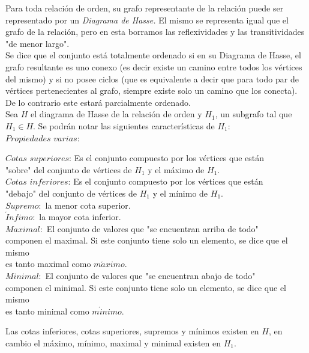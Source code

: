 \documentclass[titlepage,a4paper,12pt,twoside]{article}
\begin{document}
Para toda relación de orden, su grafo representante de la relación puede ser representado por un \textit{Diagrama de Hasse.} El mismo se representa igual que el grafo de la relación, pero en esta borramos las reflexividades y las transitividades "de menor largo".\\

Se dice que el conjunto está totalmente ordenado si en su Diagrama de Hasse, el grafo resultante es uno conexo (es decir existe un camino entre todos los vértices del mismo) y si no posee ciclos (que es equivalente a decir que para todo par de vértices pertenecientes al grafo, siempre existe solo un camino que los conecta). De lo contrario este estará parcialmente ordenado.\\

Sea $H$ el diagrama de Hasse de la relación de orden y $H_{1}$, un subgrafo tal que $H_{1} \in H$. Se podrán notar las siguientes características de $H_{1}$:\\

$Propiedades $ $ varias:$
\begin{flushleft}
 $Cotas $ $superiores $: Es el conjunto compuesto por los vértices que están\\ "sobre" del conjunto de vértices de $H_{1}$ y el máximo de $H_{1} $.\\
 $Cotas $ $inferiores $: Es el conjunto compuesto por los vértices que están\\ "debajo" del conjunto de vértices de $H_{1}$ y el mínimo de $H_{1} $.\\
 $Supremo: $ la menor cota superior.\\
 $\acute{I}nfimo: $ la mayor cota inferior.\\
 $Maximal: $ El conjunto de valores que "se encuentran arriba de todo"\\ componen el maximal. Si este conjunto tiene solo un elemento, se dice que el mismo\\ es tanto maximal como $m\acute{a}ximo$.\\
 $Minimal: $ El conjunto de valores que "se encuentran abajo de todo"\\ componen el minimal. Si este conjunto tiene solo un elemento, se dice que el mismo\\ es tanto minimal como $m\acute{i}nimo$.\\
\end{flushleft}



Las cotas inferiores, cotas superiores, supremos y mínimos existen en $H$, en cambio el máximo, mínimo, maximal y minimal existen en $H_{1}$.\\
\end{document}
